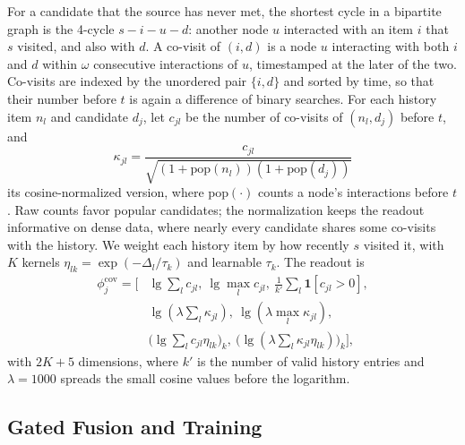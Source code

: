 \documentclass[twoside]{article}
\newcommand{\lone}{\operatorname{lg}}
\begin{document}
For a candidate that the source has never met, the shortest cycle in a bipartite graph is the 4-cycle $s - i - u - d$: another node $u$ interacted with an item $i$ that $s$ visited, and also with $d$. A co-visit of $(i,d)$ is a node $u$ interacting with both $i$ and $d$ within $\omega$ consecutive interactions of $u$, timestamped at the later of the two. Co-visits are indexed by the unordered pair $\{i,d\}$ and sorted by time, so that their number before $t$ is again a difference of binary searches. For each history item $n_l$ and candidate $d_j$, let $c_{jl}$ be the number of co-visits of $(n_l,d_j)$ before $t$, and
\begin{equation}
\kappa_{jl}=\frac{c_{jl}}{\sqrt{(1+\mathrm{pop}(n_l))(1+\mathrm{pop}(d_j))}}
\end{equation}
its cosine-normalized version, where $\mathrm{pop}(\cdot)$ counts a node's interactions before $t$. Raw counts favor popular candidates; the normalization keeps the readout informative on dense data, where nearly every candidate shares some co-visits with the history. We weight each history item by how recently $s$ visited it, with $K$ kernels $\eta_{lk}=\exp(-\Delta_l/\tau_k)$ and learnable $\tau_k$. The readout is
\begin{equation}
\begin{aligned}
\phi^{\mathrm{cov}}_j=\Big[&\lone\textstyle\sum_l c_{jl},\ \lone\max_l c_{jl},\ \tfrac{1}{k'}\textstyle\sum_l\mathbf{1}[c_{jl}>0],\\
&\lone(\lambda\textstyle\sum_l\kappa_{jl}),\ \lone(\lambda\max_l\kappa_{jl}),\\
&\big(\lone\textstyle\sum_l c_{jl}\eta_{lk}\big)_{k},\ \big(\lone(\lambda\textstyle\sum_l\kappa_{jl}\eta_{lk})\big)_{k}\Big],
\end{aligned}
\end{equation}
with $2K+5$ dimensions, where $k'$ is the number of valid history entries and $\lambda=1000$ spreads the small cosine values before the logarithm.

\subsection{Gated Fusion and Training}
\label{sec:fusion}
\end{document}
